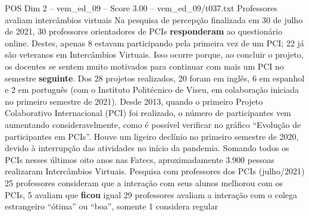 \begin{textsample}{POS Dim 2 – vem\_ed\_09 – Score 3.00 – vem\_ed\_09/t037.txt}  \label{ex:f2_pos_173}
Professores avaliam intercâmbios virtuais Na pesquisa de percepção finalizada em 30 de julho de 2021, 30 professores orientadores de PCIs \textbf{responderam} ao questionário online.
Destes, apenas 8 estavam participando pela primeira vez de um PCI; 22 já são veteranos em Intercâmbios Virtuais.
Isso ocorre porque, ao concluir o projeto, os docentes se sentem muito motivados para continuar com mais um PCI no semestre \textbf{seguinte}.
Dos 28 projetos realizados, 20 foram em inglês, 6 em espanhol e 2 em português (com o Instituto Politécnico de Viseu, em colaboração iniciada no primeiro semestre de 2021).
Desde 2013, quando o primeiro Projeto Colaborativo Internacional (PCI) foi realizado, o número de participantes vem aumentando consideravelmente, como é possível verificar no gráfico “Evolução de participantes em PCIs”.
Houve um ligeiro declínio no primeiro semestre de 2020, devido à interrupção das atividades no início da pandemia.
Somando todos os PCIs nesses últimos oito anos nas Fatecs, aproximadamente 3.900 pessoas realizaram Intercâmbios Virtuais.
Pesquisa com professores dos PCIs (julho/2021) 25 professores consideram que a interação com seus alunos melhorou com os PCIs, 5 avaliam que \textbf{ficou} igual 29 professores avaliam a interação com o colega estrangeiro “ótima” ou “boa”, somente 1 considera regular

\end{textsample}
